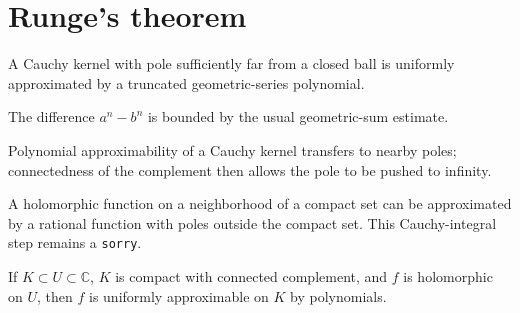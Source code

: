 \section{Runge's theorem}

\begin{lemma}
\label{lem:runge-far-pole}
\leanok
A Cauchy kernel with pole sufficiently far from a closed ball is uniformly approximated by a truncated geometric-series polynomial.
\end{lemma}

\begin{lemma}
\label{lem:runge-powers}
\leanok
The difference $a^n-b^n$ is bounded by the usual geometric-sum estimate.
\end{lemma}

\begin{lemma}
\label{lem:runge-poles}
\leanok
{}
Polynomial approximability of a Cauchy kernel transfers to nearby poles; connectedness of the complement then allows the pole to be pushed to infinity.
\end{lemma}

\begin{lemma}
\label{lem:runge-rational}
\notready
A holomorphic function on a neighborhood of a compact set can be approximated by a rational function with poles outside the compact set. This Cauchy-integral step remains a \texttt{sorry}.
\end{lemma}

\begin{theorem}[Runge]
\label{thm:runge}
\notready
{}
If $K\subset U\subset\mathbb C$, $K$ is compact with connected complement, and $f$ is holomorphic on $U$, then $f$ is uniformly approximable on $K$ by polynomials.
\end{theorem}
